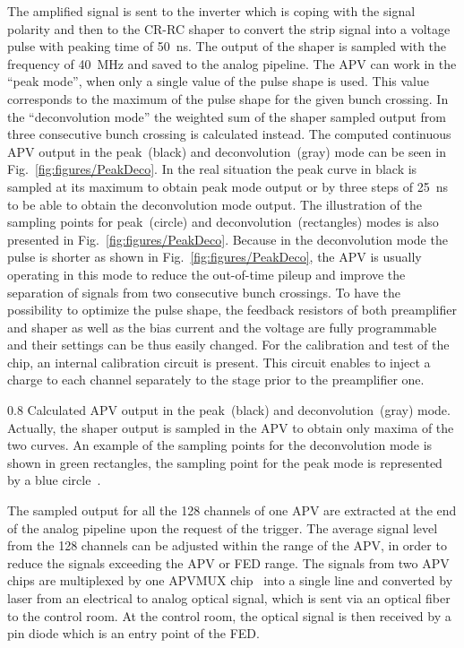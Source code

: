 The amplified signal is sent to the inverter which is coping with the signal polarity and then to the CR-RC shaper to convert the strip signal into a voltage pulse with peaking time of 50~ns. The output of the shaper is sampled with the frequency of 40~MHz and saved to the analog pipeline. The APV can work in the ``peak mode'', when only a single value of the pulse shape is used. This value corresponds to the maximum of the pulse shape for the given bunch crossing. In the ``deconvolution mode'' the weighted sum of the shaper sampled output from three consecutive bunch crossing is calculated instead. The computed continuous APV output in the peak~(black) and deconvolution~(gray) mode can be seen in Fig.~\ref{fig:figures/PeakDeco}. In the real situation the peak curve in black is sampled at its maximum to obtain peak mode output or by three steps of 25~ns to be able to obtain the deconvolution mode output. The illustration of the sampling points for peak~(circle) and deconvolution~(rectangles) modes is also presented in Fig.~\ref{fig:figures/PeakDeco}. Because in the deconvolution mode the pulse is shorter as shown in Fig.~\ref{fig:figures/PeakDeco}, the APV is usually operating in this mode to reduce the out-of-time pileup and improve the separation of signals from two consecutive bunch crossings. To have the possibility to optimize the pulse shape, the feedback resistors of both preamplifier and shaper as well as the bias current and the voltage are fully programmable and their settings can be thus easily changed. For the calibration and test of the chip, an internal calibration circuit is present. This circuit enables to inject a charge to each channel separately to the stage prior to the preamplifier one.


                 {0.8}       %
                 {Calculated APV output in the peak~(black) and deconvolution~(gray) mode. Actually, the shaper output is sampled in the APV to obtain only maxima of the two curves. An example of the sampling points for the deconvolution mode is shown in green rectangles, the sampling point for the peak mode is represented by a blue circle~\cite{Friedl:2001kra}.} %


The sampled output for all the 128 channels of one APV are extracted at the end of the analog pipeline upon the request of the trigger. The average signal level from the 128 channels can be adjusted within the range of the APV, in order to reduce the signals exceeding the APV or FED range. The signals from two APV chips are multiplexed by one APVMUX chip~\cite{Ball:2007zza} into a single line and converted by laser from an electrical to analog optical signal, which is sent via an optical fiber to the control room. At the control room, the optical signal is then received by a pin diode which is an entry point of the FED.

